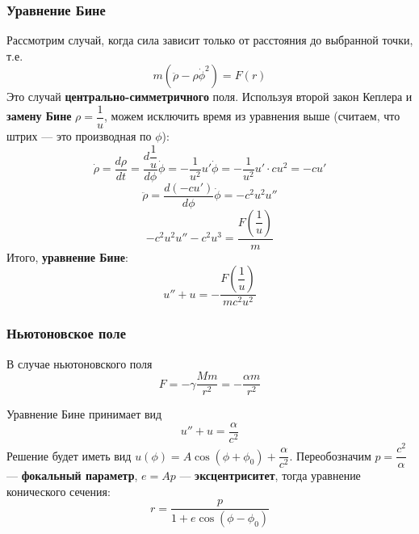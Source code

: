 \subsubsection{Уравнение Бине}
Рассмотрим случай, когда сила зависит только от расстояния до выбранной точки, т.е.
\[
m(\ddot{\rho} - \rho\dot{\phi}^2) = F(r)
\]
Это случай \textbf{центрально-симметричного} поля. Используя второй закон Кеплера и \textbf{замену Бине} $\rho = \dfrac{1}{u}$, можем исключить время из уравнения выше (считаем, что штрих --- это производная по $\phi$):
\[
\dot{\rho} = \dfrac{d \rho}{d t} = \dfrac{d \dfrac{1}{u}}{d \phi}\dot{\phi} = -\dfrac{1}{u^2}u'\dot{\phi} = - \dfrac{1}{u^2}u'\cdot cu^2 = -c u'
\]
\[
\ddot{\rho} = \dfrac{d(-cu')}{d \phi}\dot{\phi} = -c^2u^2u''
\]
\[
    -c^2u^2u'' - c^2u^3 = \dfrac{F\left(\dfrac{1}{u}\right)}{m}
\]
Итого, \textbf{уравнение Бине}:
\[
u'' + u = -\dfrac{F\left(\dfrac{1}{u}\right)}{mc^2u^2}
\]
\subsubsection{Ньютоновское поле}
В случае ньютоновского поля
\[
F = - \gamma \dfrac{Mm}{r^2} = -\dfrac{\alpha m}{r^2}
\]

Уравнение Бине принимает вид
\[
u'' + u = \dfrac{\alpha}{c^2}
\]
Решение будет иметь вид $u(\phi) = A \cos(\phi + \phi_0) + \dfrac{\alpha}{c^2}$. Переобозначим $p = \dfrac{c^2}{\alpha}$ --- \textbf{фокальный параметр}, $e = Ap$ --- \textbf{эксцентриситет}, тогда уравнение конического сечения:
\[
r = \dfrac{p}{1 + e \cos{(\phi - \phi_0)}}
\]